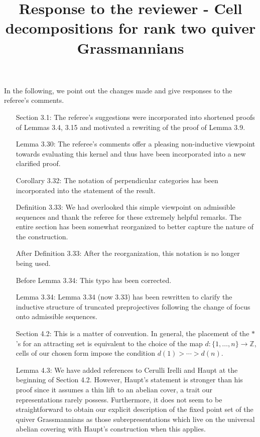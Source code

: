 \documentclass[11pt,a4paper]{{scrartcl}}
\title{Response to the reviewer - Cell decompositions for rank two quiver Grassmannians}
\date{}
\newcommand\Zn{\mathbb{Z}}
\begin{document}
\pagestyle{empty}

\maketitle

\noindent In the following, we point out the changes made and give responses to the referee's comments.

\renewcommand{\labelenumi}{(\arabic{enumi})}
\begin{enumerate}
  \item[Section 3.1:] The referee's suggestions were incorporated into shortened proofs of Lemmas 3.4, 3.15 and motivated a rewriting of the proof of Lemma 3.9.
  \item[Lemma 3.30:] The referee's comments offer a pleasing non-inductive viewpoint towards evaluating this kernel and thus have been incorporated into a new clarified proof.
  \item[Corollary 3.32:] The notation of perpendicular categories has been incorporated into the statement of the result.
  \item[Definition 3.33:] We had overlooked this simple viewpoint on admissible sequences and thank the referee for these extremely helpful remarks.
    The entire section has been somewhat reorganized to better capture the nature of the construction.
  \item[After Definition 3.33:] After the reorganization, this notation is no longer being used.
  \item[Before Lemma 3.34:] This typo has been corrected.
  \item[Lemma 3.34:] Lemma 3.34 (now 3.33) has been rewritten to clarify the inductive structure of truncated preprojectives following the change of focus onto admissible sequences.
  \item[Section 4.2:] This is a matter of convention.
    In general, the placement of the $*$'s for an attracting set is equivalent to the choice of the map $d:\{1,\ldots,n\}\to\Zn$, cells of our chosen form impose the condition $d(1)>\cdots>d(n)$.
  \item[Lemma 4.3:] We have added references to Cerulli Irelli and Haupt at the beginning of Section 4.2.
    However, Haupt's statement is stronger than his proof since it assumes a thin lift to an abelian cover, a trait our representations rarely possess.
    Furthermore, it does not seem to be straightforward to obtain our explicit description of the fixed point set of the quiver Grassmannians as those subrepresentations which live on the universal abelian covering with Haupt's construction when this applies. 

\end{enumerate}
\end{document}
